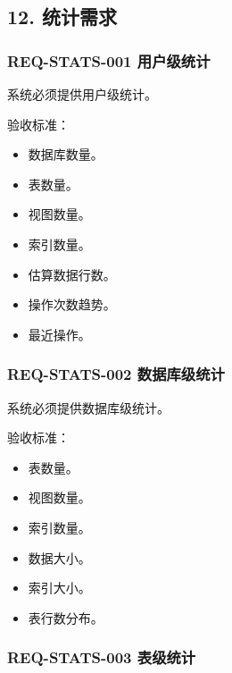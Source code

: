 \documentclass[
  a4paper,
  UTF8]{ctexart}
\providecommand{\tightlist}{%
  \setlength{\itemsep}{0pt}\setlength{\parskip}{0pt}}
\begin{document}
\hypertarget{ux7edfux8ba1ux9700ux6c42}{%
\subsection{12. 统计需求}\label{ux7edfux8ba1ux9700ux6c42}}

\hypertarget{req-stats-001-ux7528ux6237ux7ea7ux7edfux8ba1}{%
\subsubsection{REQ-STATS-001
用户级统计}\label{req-stats-001-ux7528ux6237ux7ea7ux7edfux8ba1}}

系统必须提供用户级统计。

验收标准：

\begin{itemize}
\tightlist
\item
  数据库数量。
\item
  表数量。
\item
  视图数量。
\item
  索引数量。
\item
  估算数据行数。
\item
  操作次数趋势。
\item
  最近操作。
\end{itemize}

\hypertarget{req-stats-002-ux6570ux636eux5e93ux7ea7ux7edfux8ba1}{%
\subsubsection{REQ-STATS-002
数据库级统计}\label{req-stats-002-ux6570ux636eux5e93ux7ea7ux7edfux8ba1}}

系统必须提供数据库级统计。

验收标准：

\begin{itemize}
\tightlist
\item
  表数量。
\item
  视图数量。
\item
  索引数量。
\item
  数据大小。
\item
  索引大小。
\item
  表行数分布。
\end{itemize}

\hypertarget{req-stats-003-ux8868ux7ea7ux7edfux8ba1}{%
\subsubsection{REQ-STATS-003
表级统计}\label{req-stats-003-ux8868ux7ea7ux7edfux8ba1}}
\end{document}
